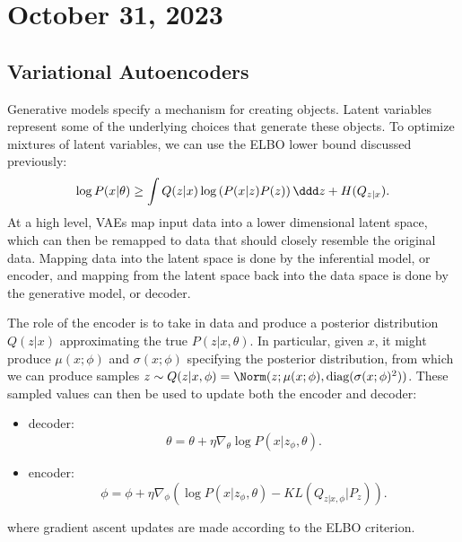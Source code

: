 \section{October 31, 2023}

\subsection{Variational Autoencoders}

Generative models specify a mechanism for creating objects. Latent variables represent some of the underlying choices that generate these objects. To optimize mixtures of latent variables, we can use the ELBO lower bound discussed previously: 
\[\log P(x|\theta) \geq \int Q(z|x)\log \left(P(x|z)P(z)\right) \ddd z + H(Q_{z|x}).\] 
At a high level, VAEs map input data into a lower dimensional latent space, which can then be remapped to data that should closely resemble the original data. Mapping data into the latent space is done by the \ac{inferential model}, or encoder, and mapping from the latent space back into the data space is done by the \ac{generative model}, or decoder. 

The role of the encoder is to take in data and produce a posterior distribution $Q(z|x)$ approximating the true $P(z|x,\theta)$. In particular, given $x$, it might produce $\mu(x;\phi)$ and $\sigma(x;\phi)$ specifying the posterior distribution, from which we can produce samples $z\sim Q(z|x,\phi) = \Norm(z; \mu(x;\phi), \text{diag}(\sigma(x;\phi)^2))$. These sampled values can then be used to update both the encoder and decoder: 
\begin{itemize}
	\item decoder: 
		\[\theta = \theta + \eta \nabla_{\theta}\log P(x|z_{\phi}, \theta).\]
	\item encoder: 
		\[\phi = \phi + \eta \nabla_{\phi}\left(\log P(x|z_{\phi},\theta) - KL(Q_{z|x,\phi} | P_z)\right).\] 
\end{itemize}
where gradient ascent updates are made according to the ELBO criterion.



